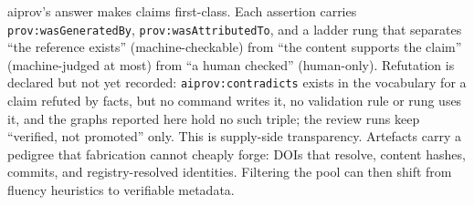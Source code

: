 aiprov's answer makes claims first-class. Each assertion carries
\texttt{prov:wasGeneratedBy}, \texttt{prov:wasAttributedTo}, and a
ladder rung that separates ``the reference exists''
(machine-checkable) from ``the content supports the claim''
(machine-judged at most) from ``a human checked'' (human-only).
Refutation is declared but not yet recorded: \texttt{aiprov:contradicts}
exists in the vocabulary for a claim refuted by facts, but no command
writes it, no validation rule or rung uses it, and the graphs reported
here hold no such triple; the review runs keep ``verified, not
promoted'' only. This is
supply-side transparency. Artefacts carry a pedigree that fabrication
cannot cheaply forge: DOIs that resolve, content hashes, commits, and
registry-resolved identities. Filtering the pool can then shift from
fluency heuristics to verifiable metadata.
